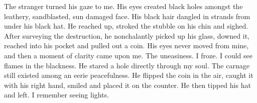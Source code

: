 The stranger turned his gaze to me. His eyes created black holes
amongst the leathery, sandblasted, sun damaged face. His black hair
dangled in strands from under his black hat. He reached up, stroked
the stubble on his chin and sighed. After surveying the
destruction, he nonchalantly picked up his glass, downed it,
reached into his pocket and pulled out a coin. His eyes never moved
from mine, and then a moment of clarity came upon me. The
uneasiness. I froze. I could see flames in the blackness. He stared
a hole directly through my soul. The carnage still existed among an
eerie peacefulness. He flipped the coin in the air, caught it with
his right hand, smiled and placed it on the counter. He then tipped
his hat and left. I remember seeing lights. 

 



